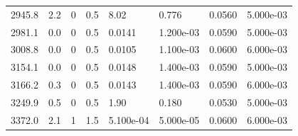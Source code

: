 \documentclass[preview]{standalone}
\begin{document}
{{\begin{tabular}{L{1.2cm}C{1.2cm} C{0.3cm}C{0.5cm} C{1.4cm}C{1.4cm} C{1.4cm}C{1.4cm}}
  2945.8  &   2.2  & 0     & 0.5 &  8.02  & 0.776  & 0.0560 &  5.000e-03   \\ 
  2981.1  &   0.0  & 0     & 0.5 &  0.0141  & 1.200e-03  & 0.0590 &  5.000e-03   \\ 
  3008.8  &   0.0  & 0     & 0.5 &  0.0105  & 1.100e-03  & 0.0600 &  6.000e-03   \\ 
  3154.1  &   0.0  & 0     & 0.5 &  0.0148  & 1.400e-03  & 0.0590 &  5.000e-03   \\ 
  3166.2  &   0.3  & 0     & 0.5 &  0.0143  & 1.400e-03  & 0.0590 &  6.000e-03   \\ 
  3249.9  &   0.5  & 0     & 0.5 &  1.90  & 0.180  & 0.0530 &  5.000e-03   \\ 
  3372.0  &   2.1  & 1     & 1.5 &  5.100e-04  & 5.000e-05  & 0.0600 &  6.000e-03   \\ 
\hline 
\end{tabular} 

}}
\end{document}
